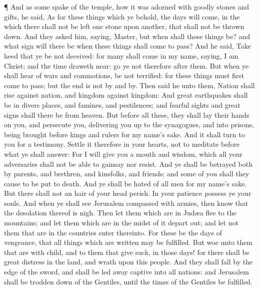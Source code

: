  ¶ And as some spake of the temple, how it was adorned with
goodly stones and gifts, he said,  As for these things which
ye behold, the days will come, in the which there shall not be left one
stone upon another, that shall not be thrown down.  And they
asked him, saying, Master, but when shall these things be? and what sign
will there be when these things shall come to pass?  And he
said, Take heed that ye be not deceived: for many shall come in my name,
saying, I am Christ; and the time draweth near: go ye not therefore
after them.  But when ye shall hear of wars and commotions,
be not terrified: for these things must first come to pass; but the end
is not by and by.  Then said he unto them, Nation shall
rise against nation, and kingdom against kingdom:  And
great earthquakes shall be in divers places, and famines, and
pestilences; and fearful sights and great signs shall there be from
heaven.  But before all these, they shall lay their hands
on you, and persecute you, delivering you up to the synagogues, and into
prisons, being brought before kings and rulers for my name's sake.
 And it shall turn to you for a testimony. 
Settle it therefore in your hearts, not to meditate before what ye shall
answer:  For I will give you a mouth and wisdom, which all
your adversaries shall not be able to gainsay nor resist. 
And ye shall be betrayed both by parents, and brethren, and kinsfolks,
and friends; and some of you shall they cause to be put to death.
 And ye shall be hated of all men for my name's sake.
 But there shall not an hair of your head perish.
 In your patience possess ye your souls.  And
when ye shall see Jerusalem compassed with armies, then know that the
desolation thereof is nigh.  Then let them which are in
Judæa flee to the mountains; and let them which are in the midst of it
depart out; and let not them that are in the countries enter thereinto.
 For these be the days of vengeance, that all things which
are written may be fulfilled.  But woe unto them that are
with child, and to them that give suck, in those days! for there shall
be great distress in the land, and wrath upon this people. 
And they shall fall by the edge of the sword, and shall be led away
captive into all nations: and Jerusalem shall be trodden down of the
Gentiles, until the times of the Gentiles be fulfilled.


